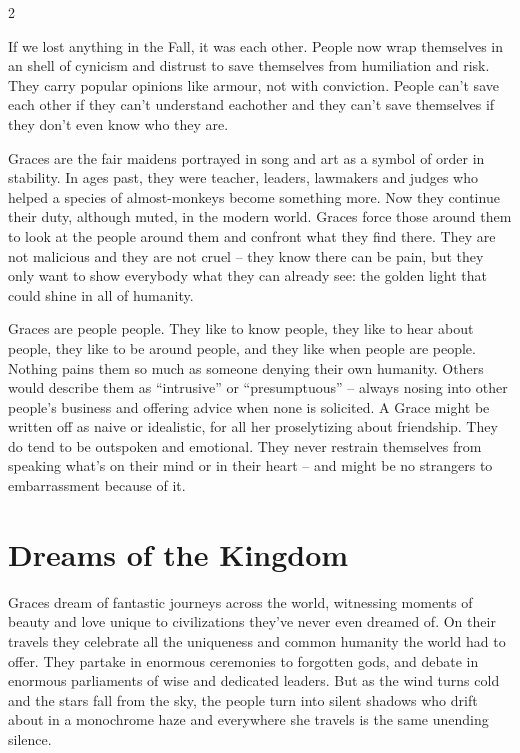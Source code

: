 \label{scha:Grace}\begin{multicols}{2}\raggedcolumns

\noindent If we lost anything in the Fall, it was each other. People now wrap themselves in an shell of cynicism and distrust to save themselves from humiliation and risk. They carry popular opinions like armour, not with conviction. People can't save each other if they can't understand eachother and they can't save themselves if they don't even know who they are.

Graces are the fair maidens portrayed in song and art as a symbol of order in stability. In ages past, they were teacher, leaders, lawmakers and judges who helped a species of almost-monkeys become something more. Now they continue their duty, although muted, in the modern world. Graces force those around them to look at the people around them and confront what they find there. They are not malicious and they are not cruel – they know there can be pain, but they only want to show everybody what they can already see: the golden light that could shine in all of humanity.

Graces are people people. They like to know people, they like to hear about people, they like to be around people, and they like when people are people. Nothing pains them so much as someone denying their own humanity. Others would describe them as “intrusive” or “presumptuous” – always nosing into other people's business and offering advice when none is solicited. A Grace might be written off as naive or idealistic, for all her proselytizing about friendship. They do tend to be outspoken and emotional. They never restrain themselves from speaking what's on their mind or in their heart – and might be no strangers to embarrassment because of it. 

\section*{Dreams of the Kingdom}
Graces dream of fantastic journeys across the world, witnessing moments of beauty and love unique to civilizations they've never even dreamed of. On their travels they celebrate all the uniqueness and common humanity the world had to offer. They partake in enormous ceremonies to forgotten gods, and debate in enormous parliaments of wise and dedicated leaders. But as the wind turns cold and the stars fall from the sky, the people turn into silent shadows who drift about in a monochrome haze and everywhere she travels is the same unending silence. 


\end{multicols}
